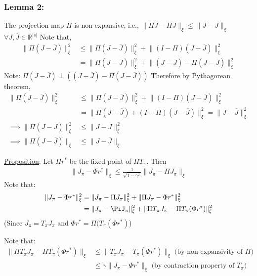 \documentclass[11pt]{article}
\begin{document}
\subsubsection{Lemma 2:}
\label{sec:orge6cea86}
The projection map \(\Pi\) is non-expansive, i.e., \(\lVert \Pi J - \Pi \overline{J} \rVert_{\xi} \leq \lVert J - \overline{J} \rVert_{\xi}\) \(\forall J, \overline{J} \in \mathbb{R}^{|s|}\)
Note that,
\begin{align*}
\lVert \Pi (J - \overline{J}) \rVert_{\xi}^2 &\leq \lVert \Pi (J - \overline{J}) \rVert_{\xi}^2 + \lVert (I - \Pi)(J - \overline{J}) \rVert_{\xi}^2\\
&= \lVert \Pi (J - \overline{J}) \rVert_{\xi}^2 + \lVert (J - \overline{J}) - \Pi(J - \overline{J})\rVert_{\xi}^2
\end{align*}
Note: \(\Pi (J - \overline{J}) \perp ((J - \overline{J}) - \Pi(J - \overline{J}))\)
Therefore by Pythagorean theorem,
\begin{align*}
\lVert \Pi (J - \overline{J}) \rVert_{\xi}^2 &\leq \lVert \Pi (J - \overline{J}) \rVert_{\xi}^2 + \lVert (I - \Pi)(J - \overline{J}) \rVert_{\xi}^2\\
&= \lVert \Pi(J - \overline{J}) + (I - \Pi)(J - \overline{J}) \rVert_{\xi}^2 = \lVert J - \overline{J} \rVert_{\xi}^2 \\
\implies \lVert \Pi (J - \overline{J}) \rVert_{\xi}^2 &\leq \lVert J - \overline{J} \rVert_{\xi}^2 \\
\implies \lVert \Pi (J - \overline{J}) \rVert_{\xi} &\leq \lVert J - \overline{J} \rVert_{\xi}
\end{align*}

\uline{Proposition}: Let \(\Pi r^{*}\) be the fixed point of \(\Pi T_{\pi}\). Then
\begin{align*}
\lVert J_{\pi} - \Phi r^{*} \rVert_{\xi} \leq \frac{1}{\sqrt{1 - \gamma^2}}\lVert J_{\pi} - \Pi J_{\pi} \rVert_{\xi}
\end{align*}
Note that:
\begin{align*}
\lVert J_{\pi} - \Phi r^{*} \rVert_{\xi}^2 &= \lVert J_{\pi} - \Pi J_{\pi} \rVert_{\xi}^2 + \lVert \Pi J_{\pi} - \Phi r^{*} \rVert_{\xi}^2 \\
&= \lVert J_{\pi} - \PiJ_{\pi}\rVert_{\xi}^2 + \lVert \Pi T_{\pi}J_{\pi} - \Pi T_{\pi}(\Phi r^{*}) \rVert_{\xi}^2
\end{align*}
(Since \(J_{\pi} = T_{\pi}J_{\pi}\) and \(\Phi r^{*} = \Pi(T_{\pi}(\Phi r^{*})\))

Note that:
\begin{align*}
\lVert \Pi T_{\pi}J_{\pi} - \Pi T_{\pi}(\Phi r^{*}) \rVert_{\xi} &\leq \lVert T_{\pi}J_{\pi} - T_{\pi}(\Phi r^{*}) \rVert_{\xi} \text{  (by non-expansivity of $\Pi$)} \\
&\leq \gamma \lVert J_{\pi} - \Phi r^{*} \rVert_{\xi} \text{  (by contraction property of $T_{\pi}$)} \\
\end{align*}
\end{document}
